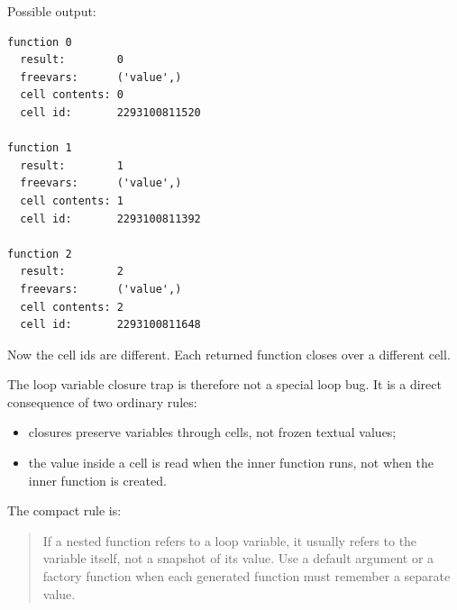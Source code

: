 Possible output:

\begin{verbatim}
function 0
  result:        0
  freevars:      ('value',)
  cell contents: 0
  cell id:       2293100811520

function 1
  result:        1
  freevars:      ('value',)
  cell contents: 1
  cell id:       2293100811392

function 2
  result:        2
  freevars:      ('value',)
  cell contents: 2
  cell id:       2293100811648
\end{verbatim}

Now the cell ids are different. Each returned function closes over a different cell.

The loop variable closure trap is therefore not a special loop bug. It is a direct consequence of two ordinary rules:

\begin{itemize}
    \item closures preserve variables through cells, not frozen textual values;
    \item the value inside a cell is read when the inner function runs, not when the inner function is created.
\end{itemize}

The compact rule is:

\begin{quote}
If a nested function refers to a loop variable, it usually refers to the variable itself, not a snapshot of its value. Use a default argument or a factory function when each generated function must remember a separate value.
\end{quote}